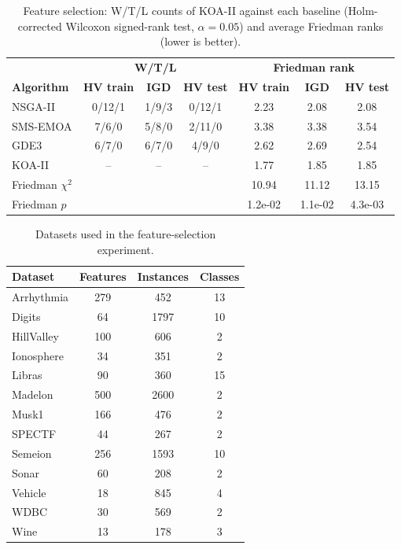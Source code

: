 \begin{table}[!htbp]
\caption{Feature selection: W/T/L counts of KOA-II against each baseline (Holm-corrected Wilcoxon signed-rank test, $\alpha=0.05$) and average Friedman ranks (lower is better).}
\label{tab:fs_wtl}
\centering
\small
\setlength{\tabcolsep}{4pt}
\renewcommand{\arraystretch}{1.1}
\begin{tabular}{@{}lcccccc@{}}
\hline
 & \multicolumn{3}{c}{\textbf{W/T/L}} & \multicolumn{3}{c}{\textbf{Friedman rank}} \\
\textbf{Algorithm} & \textbf{HV train} & \textbf{IGD} & \textbf{HV test} & \textbf{HV train} & \textbf{IGD} & \textbf{HV test} \\
\hline
NSGA-II & 0/12/1 & 1/9/3 & 0/12/1 & 2.23 & 2.08 & 2.08 \\
SMS-EMOA & 7/6/0 & 5/8/0 & 2/11/0 & 3.38 & 3.38 & 3.54 \\
GDE3 & 6/7/0 & 6/7/0 & 4/9/0 & 2.62 & 2.69 & 2.54 \\
KOA-II & -- & -- & -- & 1.77 & 1.85 & 1.85 \\
\hline
Friedman $\chi^2$  &  &  & & 10.94 & 11.12 & 13.15 \\
Friedman $p$  &  &  & & 1.2e-02 & 1.1e-02 & 4.3e-03 \\
\hline
\end{tabular}
\end{table}

\begin{table}[!htbp]
\caption{Datasets used in the feature-selection experiment.}
\label{tab:fs_datasets}
\centering
\small
\begin{tabular}{@{}lccc@{}}
\hline
\textbf{Dataset} & \textbf{Features} & \textbf{Instances} & \textbf{Classes} \\
\hline
Arrhythmia & 279 & 452 & 13 \\
Digits & 64 & 1797 & 10 \\
HillValley & 100 & 606 & 2 \\
Ionosphere & 34 & 351 & 2 \\
Libras & 90 & 360 & 15 \\
Madelon & 500 & 2600 & 2 \\
Musk1 & 166 & 476 & 2 \\
SPECTF & 44 & 267 & 2 \\
Semeion & 256 & 1593 & 10 \\
Sonar & 60 & 208 & 2 \\
Vehicle & 18 & 845 & 4 \\
WDBC & 30 & 569 & 2 \\
Wine & 13 & 178 & 3 \\
\hline
\end{tabular}
\end{table}
